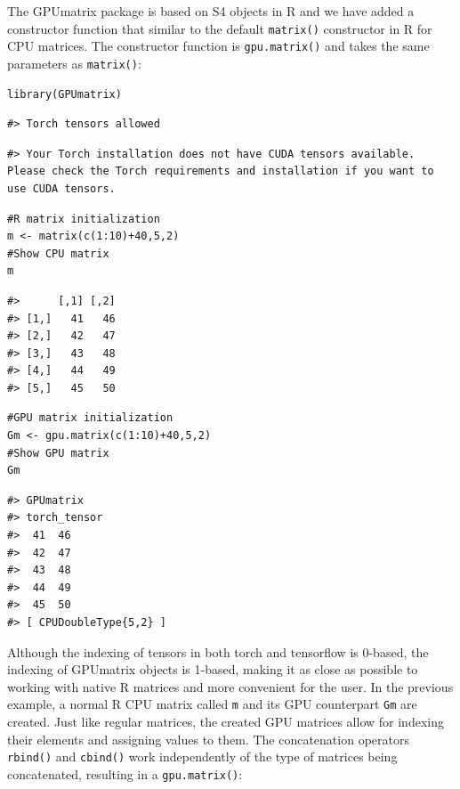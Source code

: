 The GPUmatrix package is based on S4 objects in R and we have added a constructor function that similar to the default \texttt{matrix()} constructor in R for CPU matrices. The constructor function is \texttt{gpu.matrix()} and takes the same parameters as \texttt{matrix()}:

\begin{verbatim}
library(GPUmatrix)
\end{verbatim}

\begin{verbatim}
#> Torch tensors allowed
\end{verbatim}

\begin{verbatim}
#> Your Torch installation does not have CUDA tensors available. Please check the Torch requirements and installation if you want to use CUDA tensors.
\end{verbatim}

\begin{verbatim}
#R matrix initialization
m <- matrix(c(1:10)+40,5,2)
#Show CPU matrix
m
\end{verbatim}

\begin{verbatim}
#>      [,1] [,2]
#> [1,]   41   46
#> [2,]   42   47
#> [3,]   43   48
#> [4,]   44   49
#> [5,]   45   50
\end{verbatim}

\begin{verbatim}
#GPU matrix initialization
Gm <- gpu.matrix(c(1:10)+40,5,2)
#Show GPU matrix
Gm
\end{verbatim}

\begin{verbatim}
#> GPUmatrix
#> torch_tensor
#>  41  46
#>  42  47
#>  43  48
#>  44  49
#>  45  50
#> [ CPUDoubleType{5,2} ]
\end{verbatim}

Although the indexing of tensors in both torch and tensorflow is 0-based, the indexing of GPUmatrix objects is 1-based, making it as close as possible to working with native R matrices and more convenient for the user. In the previous example, a normal R CPU matrix called \texttt{m} and its GPU counterpart \texttt{Gm} are created. Just like regular matrices, the created GPU matrices allow for indexing their elements and assigning values to them. The concatenation operators \texttt{rbind()} and \texttt{cbind()} work independently of the type of matrices being concatenated, resulting in a \texttt{gpu.matrix()}:

